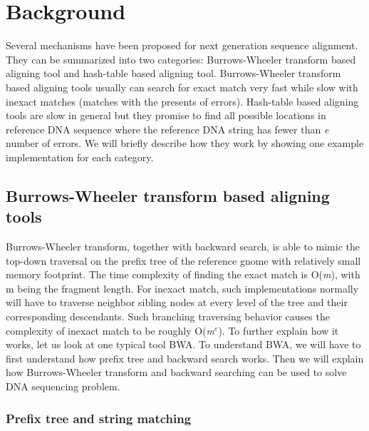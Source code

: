 \section{Background} \label{sec:background} 

Several mechanisms have been proposed for next generation sequence alignment.
They can be summarized into two categories: Burrows-Wheeler transform based
aligning tool and hash-table based aligning tool. Burrows-Wheeler transform
based aligning tools usually can search for exact match very fast while slow
with inexact matches (matches with the presents of errors). Hash-table based
aligning tools are slow in general but they promise to find all possible
locations in reference DNA sequence where the reference DNA string has fewer
than \textit{e} number of errors. We will briefly describe how they work by
showing one example implementation for each category. \\

\subsection{Burrows-Wheeler transform based aligning tools} \label{bwt}

Burrows-Wheeler transform, together with backward search, is able to mimic the
top-down traversal on the prefix tree of the reference gnome with relatively
small memory footprint. The time complexity of finding the exact match is
O(\textit{m}), with m being the fragment length. For inexact match, such
implementations normally will have to traverse neighbor sibling nodes at every
level of the tree and their corresponding descendants. Such branching
traversing behavior causes the complexity of inexact match to be roughly
O(\textit{m$^{e}$}).  To further explain how it works, let us look at one typical
tool BWA. To understand BWA, we will have to first understand how prefix tree
and backward search works. Then we will explain how Burrows-Wheeler transform
and backward searching can be used to solve DNA sequencing problem. 

\subsubsection{Prefix tree and string matching} \label{prefix_tree}

